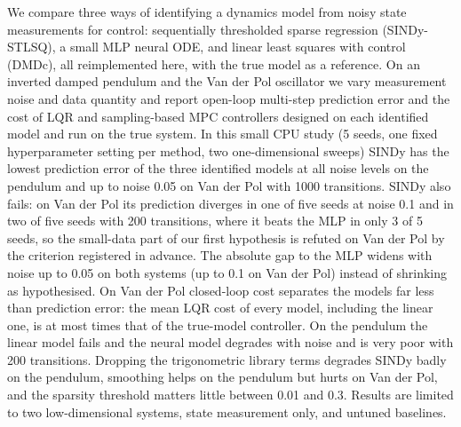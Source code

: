 We compare three ways of identifying a dynamics model from noisy state measurements for control: sequentially thresholded sparse regression (SINDy-STLSQ), a small MLP neural ODE, and linear least squares with control (DMDc), all reimplemented here, with the true model as a reference. On an inverted damped pendulum and the Van der Pol oscillator we vary measurement noise and data quantity and report open-loop multi-step prediction error and the cost of LQR and sampling-based MPC controllers designed on each identified model and run on the true system. In this small CPU study (5 seeds, one fixed hyperparameter setting per method, two one-dimensional sweeps) SINDy has the lowest prediction error of the three identified models at all noise levels on the pendulum and up to noise 0.05 on Van der Pol with 1000 transitions. SINDy also fails: on Van der Pol its prediction diverges in one of five seeds at noise 0.1 and in two of five seeds with 200 transitions, where it beats the MLP in only 3 of 5 seeds, so the small-data part of our first hypothesis is refuted on Van der Pol by the criterion registered in advance. The absolute gap to the MLP widens with noise up to 0.05 on both systems (up to 0.1 on Van der Pol) instead of shrinking as hypothesised. On Van der Pol closed-loop cost separates the models far less than prediction error: the mean LQR cost of every model, including the linear one, is at most  times that of the true-model controller. On the pendulum the linear model fails and the neural model degrades with noise and is very poor with 200 transitions. Dropping the trigonometric library terms degrades SINDy badly on the pendulum, smoothing helps on the pendulum but hurts on Van der Pol, and the sparsity threshold matters little between 0.01 and 0.3. Results are limited to two low-dimensional systems, state measurement only, and untuned baselines.
